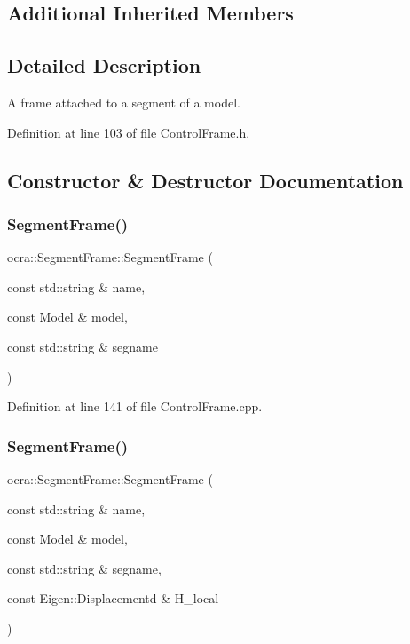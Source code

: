\subsection*{Additional Inherited Members}


\subsection{Detailed Description}
A frame attached to a segment of a model. 

Definition at line 103 of file Control\+Frame.\+h.



\subsection{Constructor \& Destructor Documentation}
\hypertarget{classocra_1_1SegmentFrame_ab05987e2ecc0f904c905b9e66269ce84}{}\label{classocra_1_1SegmentFrame_ab05987e2ecc0f904c905b9e66269ce84} 
\subsubsection{\texorpdfstring{Segment\+Frame()}{SegmentFrame()}\hspace{0.1cm}{\footnotesize\ttfamily [1/4]}}
{\footnotesize\ttfamily ocra\+::\+Segment\+Frame\+::\+Segment\+Frame (\begin{DoxyParamCaption}\item[{const std\+::string \&}]{name,  }\item[{const Model \&}]{model,  }\item[{const std\+::string \&}]{segname }\end{DoxyParamCaption})}



Definition at line 141 of file Control\+Frame.\+cpp.

\hypertarget{classocra_1_1SegmentFrame_ad9cd47c330239c77e913d38029af808d}{}\label{classocra_1_1SegmentFrame_ad9cd47c330239c77e913d38029af808d} 
\subsubsection{\texorpdfstring{Segment\+Frame()}{SegmentFrame()}\hspace{0.1cm}{\footnotesize\ttfamily [2/4]}}
{\footnotesize\ttfamily ocra\+::\+Segment\+Frame\+::\+Segment\+Frame (\begin{DoxyParamCaption}\item[{const std\+::string \&}]{name,  }\item[{const Model \&}]{model,  }\item[{const std\+::string \&}]{segname,  }\item[{const Eigen\+::\+Displacementd \&}]{H\+\_\+local }\end{DoxyParamCaption})}



